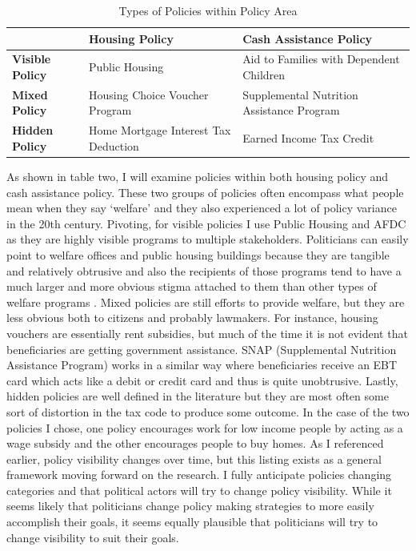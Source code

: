\documentclass[12pt]{article}
\begin{document}
\begin{table}
\centering
    \begin{tabularx}{\textwidth}{XXX} \toprule
           & \textbf{Housing Policy} & \textbf{Cash Assistance Policy} \\ \midrule
    \textbf{Visible Policy} & Public Housing        & Aid to Families with Dependent Children \\
        \textbf{Mixed Policy} & Housing Choice Voucher Program        & Supplemental Nutrition Assistance Program \\
    \textbf{Hidden Policy} & Home Mortgage Interest Tax Deduction        & Earned Income Tax Credit \\ \bottomrule
    \end{tabularx}
  \caption{Types of Policies within Policy Area}
  \label{tab:types}
\end{table}

As shown in table two, I will examine policies within both housing policy and cash assistance policy. These two groups of policies often encompass what people mean when they say `welfare' and they also experienced a lot of policy variance in the 20th century. Pivoting, for visible policies I use Public Housing and AFDC as they are highly visible programs to multiple stakeholders. Politicians can easily point to welfare offices and public housing buildings because they are tangible and relatively obtrusive and also the recipients of those programs tend to have a much larger and more obvious stigma attached to them than other types of welfare programs \citep{soss2002}. Mixed policies are still efforts to provide welfare, but they are less obvious both to citizens and probably lawmakers. For instance, housing vouchers are essentially rent subsidies, but much of the time it is not evident that beneficiaries are getting government assistance. SNAP (Supplemental Nutrition Assistance Program) works in a similar way where beneficiaries receive an EBT card which acts like a debit or credit card and thus is quite unobtrusive. Lastly, hidden policies are well defined in the literature but they are most often some sort of distortion in the tax code to produce some outcome. In the case of the two policies I chose, one policy encourages work for low income people by acting as a wage subsidy and the other encourages people to buy homes. As I referenced earlier, policy visibility changes over time, but this listing exists as a general framework moving forward on the research. I fully anticipate policies changing categories and that political actors will try to change policy visibility. While it seems likely that politicians change policy making strategies to more easily accomplish their goals, it seems equally plausible that politicians will try to change visibility to suit their goals.
\end{document}
